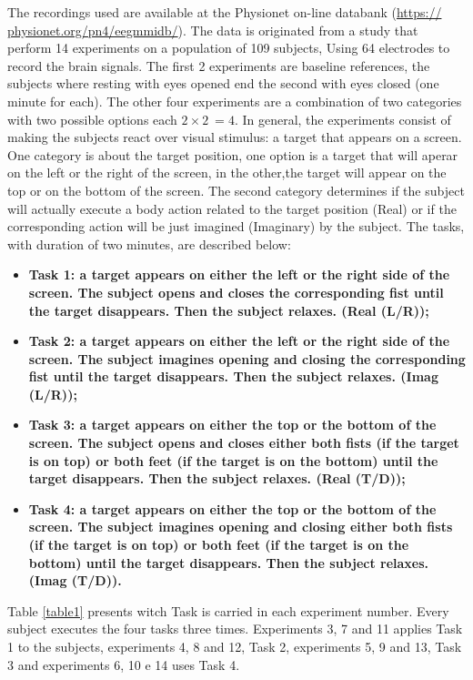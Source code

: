 \documentclass[10pt,letterpaper]{article}
\begin{document}
The recordings used are available at the Physionet on-line databank (\url{https:// physionet.org/pn4/eegmmidb/}). The data is originated from a study that perform 14 experiments on a population of 109 subjects, Using 64 electrodes to record the brain signals. The first 2 experiments are baseline references, the subjects where resting with eyes opened end the second with eyes closed (one minute for each). The other four experiments are a combination of two categories with two possible options each \(2 \times 2\ = 4\). In general, the experiments consist of making the subjects react over visual stimulus: a target that appears on a screen. One category is about the target position, one option is a target that will aperar on the left or the right of the screen, in the other,the target will appear on the top or on the bottom of the screen. The second category determines if the subject will actually execute a body action related to the target position (Real) or if the corresponding action will be just imagined (Imaginary) by the subject. The tasks, with duration of two minutes, are described below:

\begin{itemize}
  \item \bf{Task 1}: a target appears on either the left or the right side of the screen. The subject opens and closes the corresponding fist until the target disappears. Then the subject relaxes. (Real (L/R));
  \item \bf{Task 2}: a target appears on either the left or the right side of the screen. The subject \bf{imagines} opening and closing the corresponding fist until the target disappears. Then the subject relaxes. (Imag (L/R));
  \item \bf{Task 3}: a target appears on either the top or the bottom of the screen. The subject opens and closes either both fists (if the target is on top) or both feet (if the target is on the bottom) until the target disappears. Then the subject relaxes. (Real (T/D));
  \item \bf{Task 4}: a target appears on either the top or the bottom of the screen. The subject \bf{imagines} opening and closing either both fists (if the target is on top) or both feet (if the target is on the bottom) until the target disappears. Then the subject relaxes. (Imag (T/D)).
\end{itemize}

Table \ref{table1} presents witch Task is carried in each experiment number. Every subject executes the four tasks three times. Experiments 3, 7 and 11 applies Task 1 to the subjects, experiments 4, 8 and 12, Task 2, experiments 5, 9 and 13, Task 3 and experiments 6, 10 e 14 uses Task 4.
\end{document}
